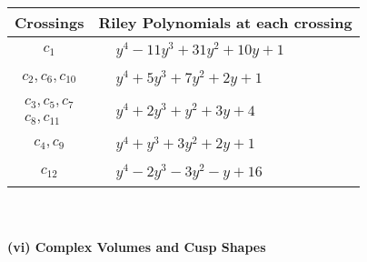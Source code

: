 \documentclass[1p]{elsarticle_modified}
\theoremstyle{definition}
\begin{document}
\begin{tabular}{m{50pt}|m{274pt}}
Crossings & \hspace{64pt}Riley Polynomials at each crossing \\
\hline $$\begin{aligned}c_{1}\end{aligned}$$&$\begin{aligned}
&y^4-11 y^3+31 y^2+10 y+1
\end{aligned}$\\
\hline $$\begin{aligned}c_{2},c_{6},c_{10}\end{aligned}$$&$\begin{aligned}
&y^4+5 y^3+7 y^2+2 y+1
\end{aligned}$\\
\hline $$\begin{aligned}c_{3},c_{5},c_{7}\\c_{8},c_{11}\end{aligned}$$&$\begin{aligned}
&y^4+2 y^3+y^2+3 y+4
\end{aligned}$\\
\hline $$\begin{aligned}c_{4},c_{9}\end{aligned}$$&$\begin{aligned}
&y^4+y^3+3 y^2+2 y+1
\end{aligned}$\\
\hline $$\begin{aligned}c_{12}\end{aligned}$$&$\begin{aligned}
&y^4-2 y^3-3 y^2- y+16
\end{aligned}$\\
\hline
\end{tabular}\\~\\
\newpage\flushleft \textbf{(vi) Complex Volumes and Cusp Shapes}
\end{document}
